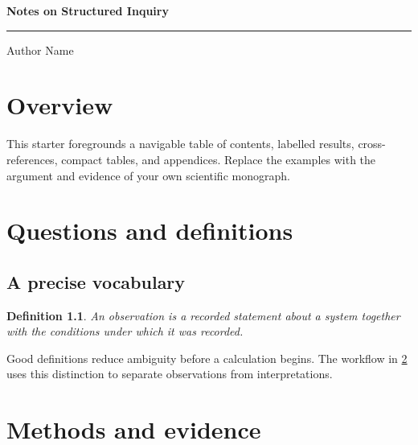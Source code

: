 \documentclass[11pt,twoside]{book}
\newtheorem{definition}[theorem]{Definition}
\begin{document}
\begin{titlepage}
\centering
\vspace*{0.85in}
{\Huge\bfseries Notes on Structured Inquiry\par}
\vspace{15pt}{\Large A scientific-style book starter\par}
\vspace{20pt}\textcolor{scigreen}{\rule{0.72\textwidth}{2pt}}\par
\vfill
{\Large Author Name\par}\vspace{6pt}{\large Research group or institution\par}
\end{titlepage}
\frontmatter
\chapter*{Overview}
This starter foregrounds a navigable table of contents, labelled results,
cross-references, compact tables, and appendices. Replace the examples with
the argument and evidence of your own scientific monograph.
\tableofcontents
\mainmatter
\chapter{Questions and definitions}\label{ch:questions}
\section{A precise vocabulary}
\begin{definition}
An observation is a recorded statement about a system together with the
conditions under which it was recorded.
\end{definition}
Good definitions reduce ambiguity before a calculation begins. The workflow
in \cref{ch:methods} uses this distinction to separate observations from
interpretations.
\chapter{Methods and evidence}\label{ch:methods}
\end{document}
